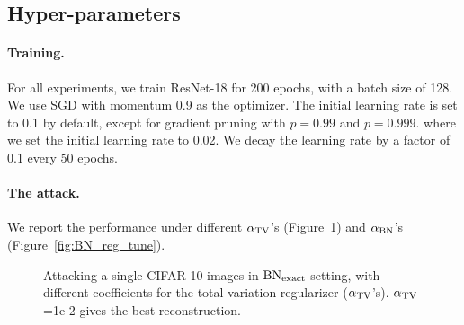 \subsection{Hyper-parameters}
\label{sec:app_hyperparam}



\paragraph{Training.} For all experiments, we train ResNet-18 for 200 epochs, with a batch size of 128. We use SGD with momentum 0.9 as the optimizer. The initial learning rate is set to 0.1 by default, except for gradient pruning with $p=0.99$ and $p=0.999$. where we set the initial learning rate to 0.02. We decay the learning rate by a factor of 0.1 every 50 epochs.

\paragraph{The attack.}  We report the performance under different $\alpha_{\rm TV}$'s (Figure~\ref{fig:BN_tv_tune}) and $\alpha_{\rm BN}$'s (Figure~\ref{fig:BN_reg_tune}).

\begin{figure}[H]
\captionsetup[subfigure]{labelfont=scriptsize, textfont=tiny}
    \centering
    
    \caption{Attacking a single CIFAR-10 images in $\rm BN_{exact}$ setting, with different coefficients for the total variation regularizer ($\alpha_{\rm TV}$'s). $\alpha_{\rm TV}$=1e-2 gives the best reconstruction.}
    \label{fig:BN_tv_tune}
\end{figure}


